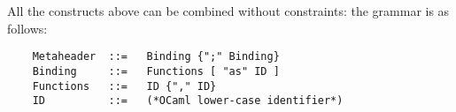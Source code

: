 
All the constructs above can be combined without constraints: the grammar is as follows:

\begin{verbatim}
    Metaheader  ::=   Binding {";" Binding}
    Binding     ::=   Functions [ "as" ID ]
    Functions   ::=   ID {"," ID}
    ID          ::=   (*OCaml lower-case identifier*)
\end{verbatim}